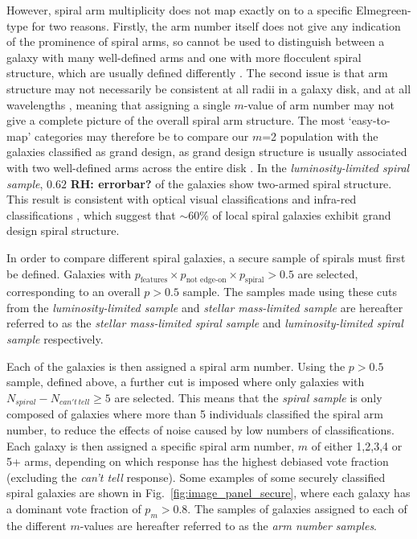 \documentclass[useAMS,usenatbib]{mn2e}
\newcommand{\rh}[1]{{\bf \textcolor{RoyalPurple}{RH: #1}}}
\begin{document}
However, spiral arm multiplicity does not map exactly on to a specific Elmegreen-type for two reasons. Firstly, the arm number itself does not give any indication of the prominence of spiral arms, so cannot be used to distinguish between a galaxy with many well-defined arms and one with more flocculent spiral structure, which are usually defined differently \citep{EE_82,EE_87}. The second issue is that arm structure may not necessarily be consistent at all radii \citep{Grosbol_04} in a galaxy disk, and at all wavelengths \citep{Block_91,Block_94,Thornley_96}, meaning that assigning a single $m$-value of arm number may not give a complete picture of the overall spiral arm structure. The most `easy-to-map' categories may therefore be to compare our $m$=2 population with the galaxies classified as grand design, as grand design structure is usually associated with two well-defined arms across the entire disk \citep{EE_82}. In the \textit{luminosity-limited spiral sample}, $0.62$ \rh{errorbar?} of the galaxies show two-armed spiral structure. This result is consistent with optical visual classifications \citep{EE_82} and infra-red classifications \citep{Grosbol_04}, which suggest that $\sim 60\%$ of local spiral galaxies exhibit grand design spiral structure. 

In order to compare different spiral galaxies, a secure sample of spirals must first be defined. Galaxies with $p_{\textrm{features}} \times p_{\textrm{not edge-on}} \times p_{\textrm{spiral}} > 0.5$ are selected, corresponding to an overall $p>0.5$ sample. The samples made using these cuts from the \textit{luminosity-limited sample} and \textit{stellar mass-limited sample} are hereafter referred to as the \textit{stellar mass-limited spiral sample} and \textit{luminosity-limited spiral sample} respectively.

Each of the galaxies is then assigned a spiral arm number. Using the $p>0.5$ sample, defined above, a further cut is imposed where only galaxies with $N_{spiral} - N_{can't \, tell} \geq 5$ are selected. This means that the \textit{spiral sample} is only composed of galaxies where more than 5 individuals classified the spiral arm number, to reduce the effects of noise caused by low numbers of classifications. Each galaxy is then assigned a specific spiral arm number, $m$ of either 1,2,3,4 or 5+ arms, depending on which response has the highest debiased vote fraction (excluding the \textit{can't tell} response). Some examples of some securely classified spiral galaxies are shown in Fig.~\ref{fig:image_panel_secure}, where each galaxy has a dominant vote fraction of $p_m > 0.8$. The samples of galaxies assigned to each of the different $m$-values are hereafter referred to as the \textit{arm number samples}. 
\end{document}
